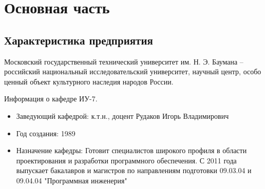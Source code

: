 \chapter{Основная часть}

\section{Характеристика предприятия}
Московский государственный технический университет им. Н. Э. Баумана -- российский национальный исследовательский университет, научный центр, особо ценный объект культурного наследия народов России.

Информация о кафедре ИУ-7.
\begin{itemize}
		\item Заведующий кафедрой: к.т.н., доцент Рудаков Игорь Владимирович
		\item Год создания: 1989
		\item Назначение кафедры:
		Готовит специалистов широкого профиля в области проектирования и разработки программного обеспечения. С 2011 года выпускает бакалавров и магистров по направлениям подготовки 09.03.04 и 09.04.04 "Программная инженерия"
\end{itemize}


